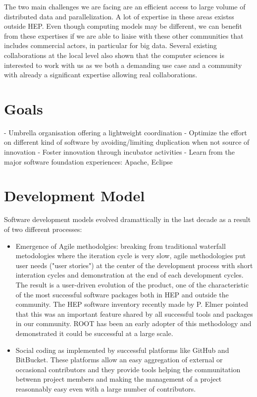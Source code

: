 \documentclass[11pt]{article} %
\begin{document}
The two main challenges we are facing are an efficient access to large volume of distributed data and parallelization. A lot of expertise in these areas existss outside HEP. Even though computing models may be different, we can benefit from these expertises if we are able to liaise with these other communities that includes commercial actors, in particular for big data. Several existing collaborations at the local level also shown that the computer sciences is interested to work with us as we both a demanding use case and a community with already a significant expertise allowing real collaborations.

\section{Goals}

- Umbrella organisation offering a lightweight coordination
- Optimize the effort on different kind of software by avoiding/limiting duplication when not source of innovation
- Foster innovation through incubator activities
- Learn from the major software foundation experiences: Apache, Eclipse
 
\section{Development Model}

Software development models evolved dramattically in the last decade as a result of two different processes:

\begin{itemize}
\item Emergence of Agile methodolgies: breaking from traditional waterfall metodologies where the iteration cycle is very slow, agile methodologies put user needs ("user stories") at the center of the development process with short interation cycles and demonstration at the end of each development cycles. The result is a user-driven evolution of the product, one of the characteristic of the most successful software packages both in HEP and outside the community. The HEP software inventory recently made by P. Elmer pointed that this was an important feature shared by all successful tools and packages in our community. ROOT has been an early adopter of this methodology and demonstrated it could be successful at a large scale.
\item Social coding as implemented by successful platforms like GitHub and BitBucket. These platforms allow an easy aggregation of external or occasional contributors and they provide tools helping the communitation betwenn project members and making the management of a project reasonnably easy even with a large number of contributors.
\end{itemize}
\end{document}
